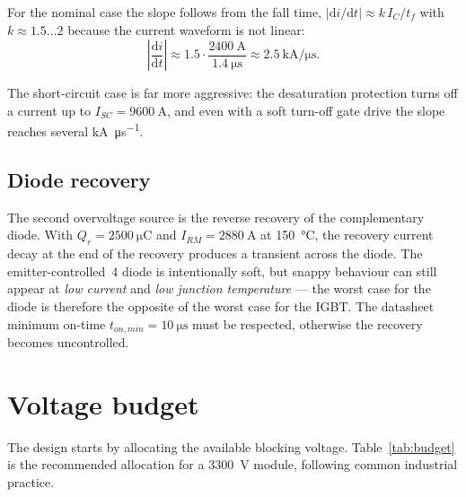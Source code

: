 \documentclass[11pt,a4paper]{article}
\begin{document}
For the nominal case the slope follows from the fall time,
$|\mathrm{d}i/\mathrm{d}t| \approx k\,I_C/t_f$ with $k \approx 1.5\ldots 2$
because the current waveform is not linear:
\begin{equation}
\left|\frac{\mathrm{d}i}{\mathrm{d}t}\right| \approx
1.5\cdot\frac{\SI{2400}{\ampere}}{\SI{1.4}{\micro\second}}
\approx \SI{2.5}{\kilo\ampere\per\micro\second}.
\end{equation}

The short-circuit case is far more aggressive: the desaturation protection
turns off a current up to $I_{SC}=\SI{9600}{\ampere}$, and even with a soft
turn-off gate drive the slope reaches several \si{\kilo\ampere\per\micro\second}.

\subsection{Diode recovery}

The second overvoltage source is the reverse recovery of the complementary
diode. With $Q_r = \SI{2500}{\micro\coulomb}$ and
$I_{RM} = \SI{2880}{\ampere}$ at \SI{150}{\celsius}, the recovery current
decay at the end of the recovery produces a transient across the diode.
The emitter-controlled~4 diode is intentionally soft, but snappy behaviour can
still appear at \emph{low current} and \emph{low junction temperature} --- the
worst case for the diode is therefore the opposite of the worst case for the
IGBT. The datasheet minimum on-time $t_{on,min}=\SI{10}{\micro\second}$ must
be respected, otherwise the recovery becomes uncontrolled.

\section{Voltage budget}

The design starts by allocating the available blocking voltage.
Table~\ref{tab:budget} is the recommended allocation for a \SI{3300}{\volt}
module, following common industrial practice.
\end{document}
